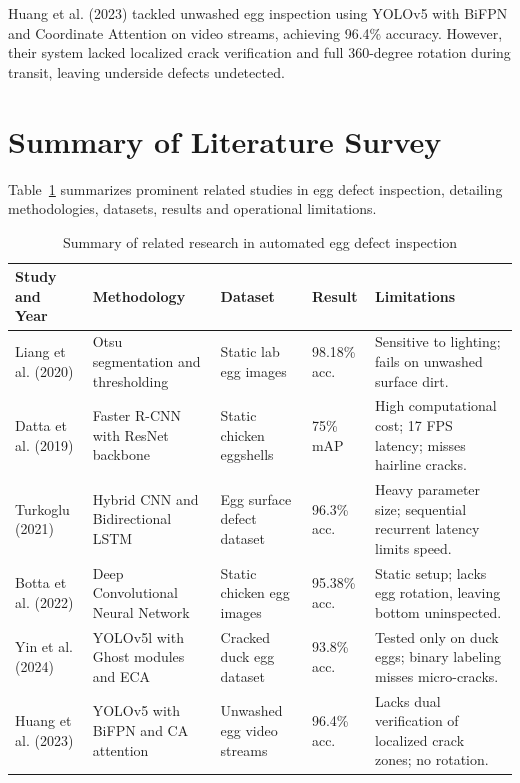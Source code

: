 \documentclass[12pt,a4paper]{report}
\begin{document}
Huang et al. (2023) tackled unwashed egg inspection using YOLOv5 with BiFPN and Coordinate Attention on video streams, achieving 96.4\% accuracy. However, their system lacked localized crack verification and full 360-degree rotation during transit, leaving underside defects undetected.

\section{Summary of Literature Survey}

Table~\ref{tab:literature_survey} summarizes prominent related studies in egg defect inspection, detailing methodologies, datasets, results and operational limitations.

\begin{table}[H]
\centering
\caption{Summary of related research in automated egg defect inspection}
\label{tab:literature_survey}
\vspace{0.2cm}
\setlength{\tabcolsep}{4pt}
\renewcommand{\arraystretch}{1.15}
\small
\begin{tabular}{|p{2.8cm}|p{2.6cm}|p{2.4cm}|p{1.8cm}|p{4.6cm}|}
\hline
\textbf{Study and Year} & \textbf{Methodology} & \textbf{Dataset} & \textbf{Result} & \textbf{Limitations} \\
\hline
Liang et al. (2020) & Otsu segmentation and thresholding & Static lab egg images & 98.18\% acc. & Sensitive to lighting; fails on unwashed surface dirt. \\
\hline
Datta et al. (2019) & Faster R-CNN with ResNet backbone & Static chicken eggshells & 75\% mAP & High computational cost; 17 FPS latency; misses hairline cracks. \\
\hline
Turkoglu (2021) & Hybrid CNN and Bidirectional LSTM & Egg surface defect dataset & 96.3\% acc. & Heavy parameter size; sequential recurrent latency limits speed. \\
\hline
Botta et al. (2022) & Deep Convolutional Neural Network & Static chicken egg images & 95.38\% acc. & Static setup; lacks egg rotation, leaving bottom uninspected. \\
\hline
Yin et al. (2024) & YOLOv5l with Ghost modules and ECA & Cracked duck egg dataset & 93.8\% acc. & Tested only on duck eggs; binary labeling misses micro-cracks. \\
\hline
Huang et al. (2023) & YOLOv5 with BiFPN and CA attention & Unwashed egg video streams & 96.4\% acc. & Lacks dual verification of localized crack zones; no rotation. \\
\hline
\end{tabular}
\end{table}
\end{document}
